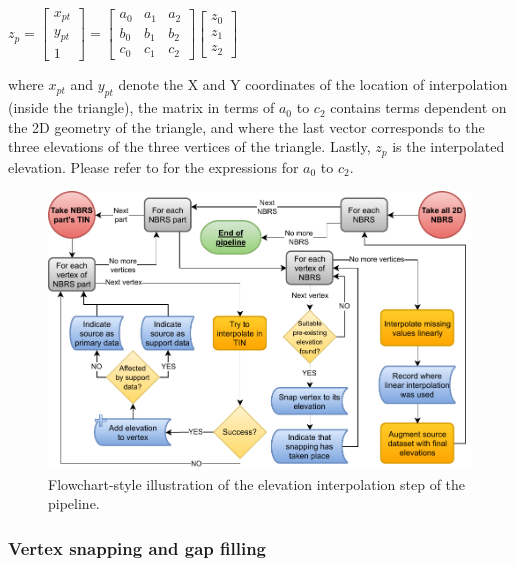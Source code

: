 $z_{p} =
\begin{bmatrix}
x_{pt}\\
y_{pt}\\ 
1
\end{bmatrix} =
\begin{bmatrix}
 a_{0} & a_{1} & a_{2} \\
 b_{0} & b_{1} & b_{2} \\
 c_{0} & c_{1} & c_{2}  
\end{bmatrix}
\begin{bmatrix}
z_{0}\\
z_{1}\\ 
z_{2}
\end{bmatrix}$

where $x_{pt}$ and $y_{pt}$ denote the X and Y coordinates of the location of interpolation (inside the triangle), the matrix in terms of $a_{0}$ to $c_{2}$ contains terms dependent on the 2D geometry of the triangle, and where the last vector corresponds to the three elevations of the three vertices of the triangle. Lastly, $z_{p}$ is the interpolated elevation. Please refer to \cite{fan_etal_2014} for the expressions for $a_{0}$ to $c_{2}$.

\begin{figure}
    \centering
    \includegraphics[width=\linewidth]{final_report/figs/elevation_interpolation.pdf}
    \caption{Flowchart-style illustration of the elevation interpolation step of the pipeline.}
    \label{fig:elevationinterpolationflow}
\end{figure}

\subsubsection{Vertex snapping and gap filling}

